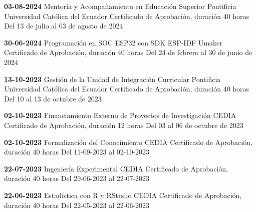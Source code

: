 \begin{levent}
    \cvevent
	{\textbf{03-08-2024}}
	{Mentoría y Acompañamiento en Educación Superior}
	{Pontificia Universidad Católica del Ecuador}
	{Certificado de Aprobación, duración 40 horas}
	{Del 13 de julio al 03 de agosto de 2024}
\end{levent}


\begin{devent}
    \cvevent
	{\textbf{30-06-2024}}
	{Programación en SOC ESP32 con SDK ESP-IDF}
	{Umaker}
	{Certificado de Aprobación, duración 40 horas}
	{Del 24 de febrero al 30 de junio de 2024}
\end{devent}


\begin{levent}
    \cvevent
	{\textbf{13-10-2023}}
	{Gestión de la Unidad de Integración Curricular}
	{Pontificia Universidad Católica del Ecuador}
	{Certificado de Aprobación, duración 40 horas}
	{Del 10 al 13 de octubre de 2023}
\end{levent}

\begin{devent}
    \cvevent
	{\textbf{02-10-2023}}
	{Financiamiento Externo de Proyectos de Investigación}
	{CEDIA}
	{Certificado de Aprobación, duración 12 horas}
	{Del 03 al 06 de octubre de 2023}
\end{devent}


\begin{levent}
    \cvevent
	{\textbf{02-10-2023}}
	{Formalización del Conocimiento}
	{CEDIA}
	{Certificado de Aprobación, duración 40 horas}
	{Del 11-09-2023 al 02-10-2023}
\end{levent}

\begin{devent}
    \cvevent
	{\textbf{22-07-2023}}
	{Ingeniería Experimental}
	{CEDIA}
	{Certificado de Aprobación, duración 40 horas}
	{Del 29-06-2023 al 22-07-2023}
\end{devent}

\begin{levent}
    \cvevent
	{\textbf{22-06-2023}}
	{Estadística con R y RStudio}
	{CEDIA}
	{Certificado de Aprobación, duración 40 horas}
	{Del 22-05-2023 al 22-06-2023}
\end{levent}

